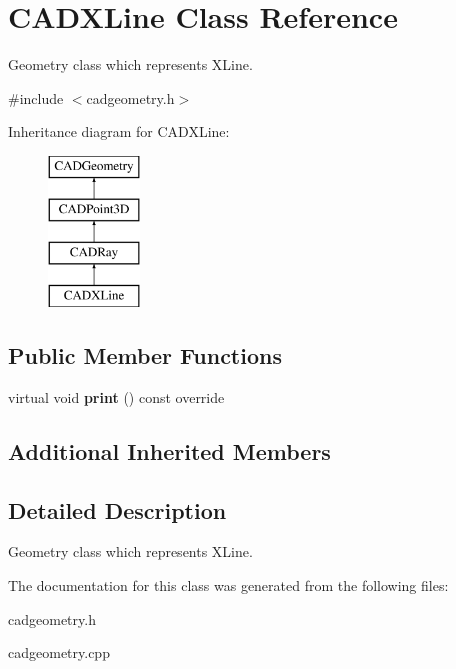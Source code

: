 \hypertarget{class_c_a_d_x_line}{}\section{C\+A\+D\+X\+Line Class Reference}
\label{class_c_a_d_x_line}


Geometry class which represents X\+Line.  




{\ttfamily \#include $<$cadgeometry.\+h$>$}

Inheritance diagram for C\+A\+D\+X\+Line\+:\begin{figure}[H]
\begin{center}
\leavevmode
\includegraphics[height=4.000000cm]{class_c_a_d_x_line}
\end{center}
\end{figure}
\subsection*{Public Member Functions}
\begin{DoxyCompactItemize}
\item 
virtual void {\bfseries print} () const  override\hypertarget{class_c_a_d_x_line_a3e4de80e9ac09ac1f58f62290f3a507f}{}\label{class_c_a_d_x_line_a3e4de80e9ac09ac1f58f62290f3a507f}

\end{DoxyCompactItemize}
\subsection*{Additional Inherited Members}


\subsection{Detailed Description}
Geometry class which represents X\+Line. 

The documentation for this class was generated from the following files\+:\begin{DoxyCompactItemize}
\item 
cadgeometry.\+h\item 
cadgeometry.\+cpp\end{DoxyCompactItemize}
